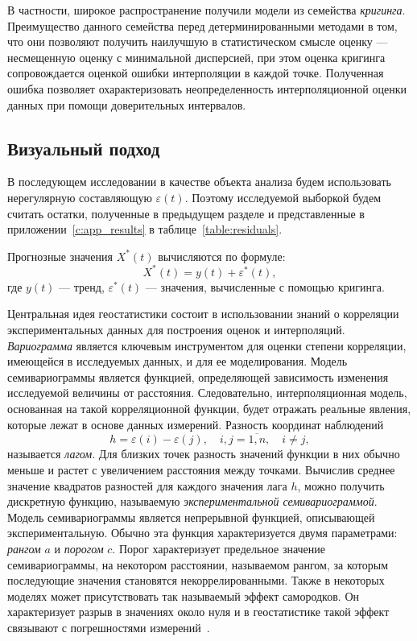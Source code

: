 В частности, широкое распространение получили модели из семейства \textit{кригинга}. Преимущество данного семейства перед детерминированными методами в том, что они позволяют получить наилучшую в статистическом смысле оценку  --- несмещенную оценку с минимальной дисперсией, при этом оценка кригинга сопровождается оценкой ошибки интерполяции в каждой точке. Полученная ошибка позволяет охарактеризовать неопределенность интерполяционной оценки данных при помощи доверительных интервалов.

\subsection{Визуальный подход} %
\label{sec:_variogram}
В последующем исследовании в качестве объекта анализа будем использовать нерегулярную составляющую $ \varepsilon(t) $. Поэтому исследуемой выборкой будем считать остатки, полученные в предыдущем разделе и представленные в приложении~\ref{c:app_results} в таблице~\ref{table:residuals}.

Прогнозные значения $ X^{*}(t) $ вычисляются по формуле:
\begin{equation*}
	X^{*}(t) = y(t) + \varepsilon^{*}(t),
\end{equation*}
где $ y(t) $ --- тренд, $ \varepsilon^{*}(t) $ --- значения, вычисленные с помощью кригинга.

Центральная идея геостатистики состоит в использовании знаний о корреляции экспериментальных данных для построения оценок и интерполяций. \textit{Вариограмма} является ключевым инструментом для оценки степени корреляции, имеющейся в исследуемых данных, и для ее моделирования. Модель семивариограммы является функцией, определяющей зависимость изменения исследуемой величины от расстояния. Следовательно, интерполяционная модель, основанная на такой корреляционной функции, будет отражать реальные явления, которые лежат в основе данных измерений. Разность координат наблюдений
\begin{equation*}
	h = \varepsilon(i) - \varepsilon(j), \quad i, j = \overline{1,n}, \quad i \neq j,
\end{equation*}
называется \textit{лагом}. Для близких точек разность значений функции в них обычно меньше и растет с увеличением расстояния между точками. Вычислив среднее значение квадратов разностей для каждого значения лага $h$, можно получить дискретную функцию, называемую \textit{экспериментальной семивариограммой}. Модель семивариограммы является непрерывной функцией, описывающей экспериментальную. Обычно эта функция характеризуется двумя параметрами: \textit{рангом} $ a $ и \textit{порогом} $ c $. Порог характеризует предельное значение семивариограммы, на некотором расстоянии, называемом рангом, за которым последующие значения становятся некоррелированными. Также в некоторых моделях может присутствовать так называемый эффект самородков. Он характеризует разрыв в значениях около нуля и в геостатистике такой эффект связывают с погрешностями измерений~\cite{saveliev2012}.

